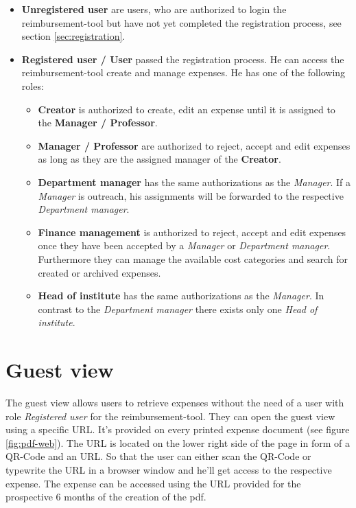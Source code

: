 \begin{itemize}
    \item \textbf{Unregistered user} are users, who are authorized to login the reimbursement-tool but have not yet completed the registration process, see section \ref{sec:registration}.
    \item \textbf{Registered user / User} passed the registration process. He can access the reimbursement-tool create and manage expenses. He has one of the following roles:

    \begin{itemize}
        \item \textbf{Creator} is authorized to create, edit an expense until it is assigned to the \textbf{Manager / Professor}.

        \item \textbf{Manager / Professor} are authorized to reject, accept and edit expenses as long as they are the assigned manager of the \textbf{Creator}.

        \item \textbf{Department manager} has the same authorizations as the \textit{Manager}. If a \textit{Manager} is outreach, his assignments will be forwarded to the respective \textit{Department manager}.

        \item \textbf{Finance management} is authorized to reject, accept and edit expenses once they have been accepted by a \textit{Manager} or \textit{Department manager}. Furthermore they can manage the available cost categories and search for created or archived expenses.

        \item \textbf{Head of institute} has the same authorizations as the \textit{Manager}. In contrast to the \textit{Department manager} there exists only one \textit{Head of institute}.
    \end{itemize}
\end{itemize}

\section{Guest view}
The guest view allows users to retrieve expenses without the need of a user with role \textit{Registered user} for the reimbursement-tool. They can open the guest view using a specific URL. It's provided on every printed expense document (see figure \ref{fig:pdf-web}). The URL is located on the lower right side of the page in form of a QR-Code and an URL. So that the user can either scan the QR-Code or typewrite the URL in a browser window and he'll get access to the respective expense. \newline
The expense can be accessed using the URL provided for the prospective 6 months of the creation of the pdf.

